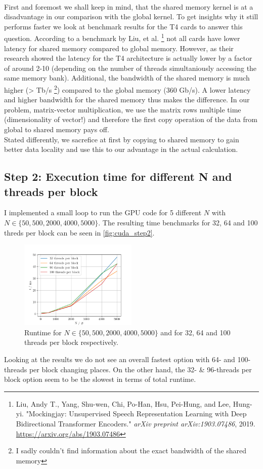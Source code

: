 \\
First and foremost we shall keep in mind, that the shared memory kernel is at a disadvantage in our comparison with the global kernel. To get insights why it still performs faster we look at benchmark results for the T4 cards to answer this question. According to a benchmark by Liu, et al. \footnote{Liu, Andy T., Yang, Shu-wen, Chi, Po-Han, Hsu, Pei-Hung, and Lee, Hung-yi. "Mockingjay: Unsupervised Speech Representation Learning with Deep Bidirectional Transformer Encoders." \textit{arXiv preprint arXiv:1903.07486}, 2019. \url{https://arxiv.org/abs/1903.07486}} not all cards have lower latency for shared memory compared to global memory. However, as their research showed the latency for the T4 architecture is actually lower by a factor of around 2-10 (depending on the number of threads simultaniously accessing the same memory bank). Additional, the bandwidth of the shared memory is much higher (> Tb/s \footnote{I sadly couldn't find information about the exact bandwidth of the shared memory}) compared to the global memory (360 Gb/s). A lower latency and higher bandwidth for the shared memory thus makes the difference. In our problem, matrix-vector multiplication, we use the matrix rows multiple time (dimensionality of vector!) and therefore the first copy operation of the data from global to shared memory pays off. \\
Stated differently, we sacrefice at first by copying to shared memory to gain better data locality and use this to our advantage in the actual calculation. 

\subsection{Step 2: Execution time for different N and threads per block}
I implemented a small loop to run the GPU code for 5 different $N$ with $N \in \{50, 500, 2000, 4000, 5000\}$. The resulting time benchmarks for 32, 64 and 100 threds per block can be seen in \autoref{fig:cuda_step2}. 
\begin{figure}[H]
    \centering
    \includegraphics[width=0.5\textwidth]{../fig/lab3/step2.png}
    \caption{Runtime for $N \in \{50, 500, 2000, 4000, 5000\}$ and for 32, 64 and 100 threads per block respectively.}
    \label{fig:cuda_step2}
\end{figure}
Looking at the results we do not see an overall fastest option with 64- and 100-threads per block changing places. On the other hand, the 32- \& 96-threads per block option seem to be the slowest in terms of total runtime. \\

